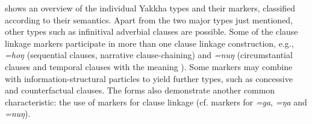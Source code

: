 \begin{table}[t]
\caption{Some characteristics of converbal and finite }\label{cl-twotypes}
\end{table}



 shows an overview of the individual  Yakkha  types and their markers, classified according to their semantics. Apart from the two major types just mentioned, other types such as infinitival adverbial clauses are possible. Some of the clause linkage markers participate in more than one clause linkage construction, e.g., \emph{=hoŋ} (sequential clauses, narrative clause-chaining) and \emph{=nuŋ} (circumstantial clauses and temporal clauses with the meaning ).  Some markers may combine with information-structural particles to yield further types, such as concessive and counterfactual clauses. The forms also demonstrate another common  characteristic: the use of  markers for clause linkage (cf.  markers for  \emph{=ga},  \emph{=ŋa} and  \emph{=nuŋ}). 

